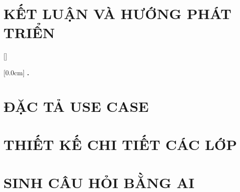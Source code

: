 \documentclass[a4paper,13pt,3p,twoside]{report}
\renewcommand{\bibname}{Danh_sach_tai_lieu_tham_khao}
\theoremstyle{definition}
\begin{document}
\chapter{KẾT LUẬN VÀ HƯỚNG PHÁT TRIỂN} %
\label{chapter:conclusion}



\newpage
\renewcommand\bibname{TÀI LIỆU THAM KHẢO}
\printbibliography
{}

\appendixpage
\appendices
\addappheadtotoc


{}[]
\titlespacing*{\chapter}{0pt}{-20pt}{20pt}

    [0.0cm]             %
    {\bfseries\vspace{0.3cm}}                  %
    {{\bfseries{\scshape} \thecontentslabel.\ }} %
    {}         %
    {\contentspage}         %

\chapter{ĐẶC TẢ USE CASE}


\chapter{THIẾT KẾ CHI TIẾT CÁC LỚP}


\chapter{SINH CÂU HỎI BẰNG AI}

\end{document}
